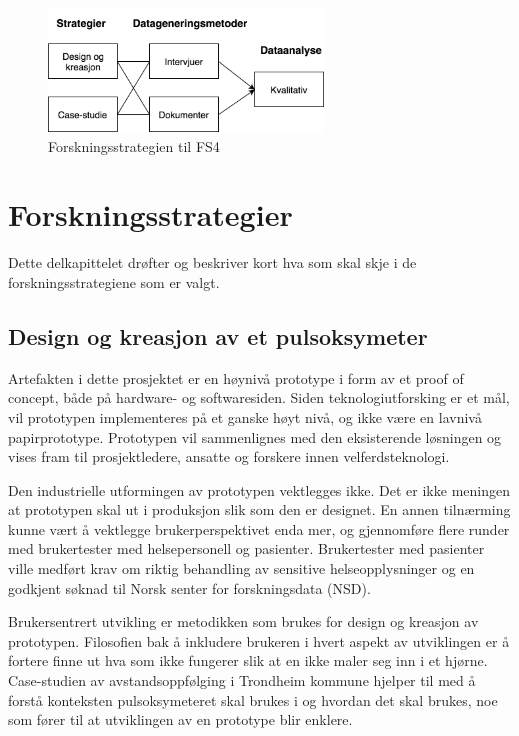 \begin{figure}
\centering
\includegraphics[width=0.65\textwidth]{fig/oates/fs4}
\caption{Forskningsstrategien til FS4}
\label{fig:oates_fs4}
\end{figure}

\section{Forskningsstrategier}
\label{sec:forskningsstrategier}
Dette delkapittelet drøfter og beskriver kort hva som skal skje i de forskningsstrategiene som er valgt.

\subsection{Design og kreasjon av et pulsoksymeter}
Artefakten i dette prosjektet er en høynivå prototype i form av et proof of concept, både på hardware- og softwaresiden.
Siden teknologiutforsking er et mål, vil
prototypen implementeres på et ganske høyt nivå, og ikke være en lavnivå papirprototype. Prototypen vil sammenlignes
med den eksisterende løsningen og vises fram til prosjektledere, ansatte og forskere innen velferdsteknologi.

Den industrielle utformingen av prototypen vektlegges ikke. Det er
ikke meningen at prototypen skal ut i produksjon slik som den er designet. En annen tilnærming kunne vært å vektlegge brukerperspektivet enda mer,
og gjennomføre flere runder med brukertester med helsepersonell og pasienter. Brukertester med pasienter ville medført krav om
riktig behandling av sensitive helseopplysninger og en godkjent søknad til Norsk senter for forskningsdata (NSD).

Brukersentrert utvikling er metodikken som brukes for design og kreasjon av prototypen. Filosofien bak å inkludere brukeren i hvert aspekt
av utviklingen er å fortere finne ut hva som ikke fungerer slik at en ikke maler seg inn i et hjørne. Case-studien av avstandsoppfølging
i Trondheim kommune hjelper til med å forstå konteksten pulsoksymeteret skal brukes i og hvordan det skal brukes, noe
som fører til at utviklingen av en prototype blir enklere.

